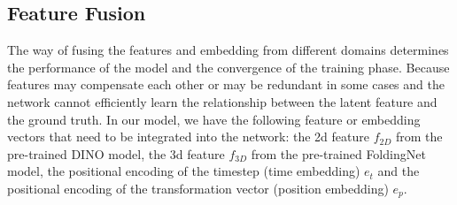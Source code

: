 \documentclass[12pt,DIV14,BCOR12mm,a4paper,footinclude=false,headinclude,parskip=half-,twoside,openright,cleardoublepage=empty,toc=index,bibliography=totoc,listof=totoc]{scrreprt}
\numberwithin{equation}{chapter}
\begin{document}
\subsection{Feature Fusion}\label{sec:fusion}
The way of fusing the features and embedding from different domains determines the performance of the model and the convergence of the training phase. Because features may compensate each other or may be redundant in some cases and the network cannot efficiently learn the relationship between the latent feature and the ground truth. In our model, we have the following feature or embedding vectors that need to be integrated into the network: the \gls{2d} feature $f_{2D}$ from the pre-trained DINO model, the \gls{3d} feature $f_{3D}$ from the pre-trained FoldingNet model, the positional encoding of the timestep (time embedding) $e_{t}$ and the positional encoding of the transformation vector (position embedding) $e_{p}$.
\end{document}
